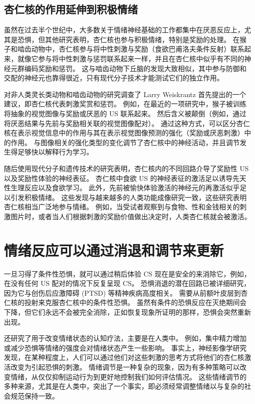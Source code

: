 \subsection{杏仁核的作用延伸到积极情绪}

虽然在过去半个世纪中，大多数关于情绪神经基础的工作都集中在厌恶反应上，尤其是恐惧，但其他研究表明，杏仁核也参与积极情绪，特别是奖励的处理。
在猴子和啮齿动物中，杏仁核参与将中性刺激与奖励（食欲巴甫洛夫条件反射）联系起来，就像它参与将中性刺激与惩罚联系起来一样，并且在杏仁核中似乎有不同的神经元群编码奖励和惩罚。
这与啮齿动物下丘脑的发现大致相似，其中参与防御和交配的神经元也靠得很近，只有现代分子技术才能测试它们的独立作用。


对非人类灵长类动物和啮齿动物的研究调查了 Larry Weiskrantz 首先提出的一个建议，即杏仁核代表刺激奖赏和惩罚。
例如，在最近的一项研究中，猴子被训练将抽象的视觉图像与奖励或厌恶的 US 联系起来。
然后含义被颠倒（例如，通过将厌恶结果与先前与奖励相关联的视觉图像配对）。
通过这种方式，可以区分杏仁核在表示视觉信息中的作用与其在表示视觉图像预测的强化（奖励或厌恶刺激）中的作用。
与图像相关的强化类型的变化调节了杏仁核中的神经活动，并且调节发生得足够快以解释行为学习。


随后使用现代分子和遗传技术的研究表明，杏仁核内的不同回路介导了奖励性 US 以及奖励性体验的神经表征。
杏仁核中食欲 US 的神经表征的激活足以诱导先天性生理反应以及食欲学习。
此外，先前被愉快体验激活的神经元的再激活似乎足以引发积极情绪。
这些发现与越来越多的人类功能成像研究一致，这些研究表明杏仁核相当广泛地参与情绪。
例如，当受试者观察到与食物、性和金钱相关的刺激图片时，或者当人们根据刺激的奖励价值做出决定时，人类杏仁核就会被激活。



\section{情绪反应可以通过消退和调节来更新}

一旦习得了条件性恐惧，就可以通过稍后体验 CS 现在是安全的来消除它，例如，在没有任何 US 配对的情况下反复呈现 CS。
恐惧消退的潜在回路已被详细研究，因为它与创伤后应激障碍 (PTSD) 等精神疾病高度相关。
需要从前额叶皮层到杏仁核的投射来克服杏仁核中的条件性恐惧。
虽然有条件的恐惧反应在灭绝期间会下降，但它们永远不会被完全消除，正如恢复现象所证明的那样，恐惧会突然重新出现。


还研究了用于改变情绪状态的认知疗法，主要是在人类中。
例如，集中精力增加或减少恐惧等情绪的强度会对情绪状态产生一些影响。
事实上，神经影像学研究发现，在某种程度上，人们可以通过他们对这些刺激的思考方式将他们的杏仁核激活改变为引起恐惧的刺激。
情绪调节是一种复杂的现象，因为有多种策略可以改变情绪，从仅仅抑制运动行为到更好地控制我们如何评估情况。
这些情绪调节的多种来源，尤其是在人类中，突出了一个事实，即必须经常调整情绪以与复杂的社会规范保持一致。



